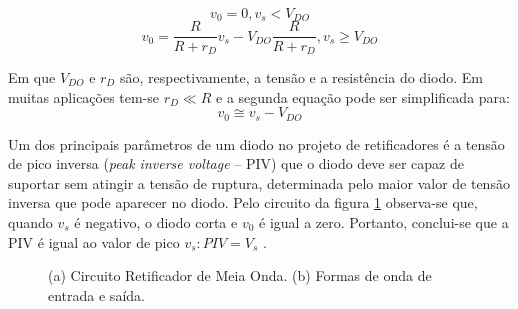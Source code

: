 \documentclass[a4paper]{article} %
\begin{document}
\begin{equation}
  v_0=0,       v_s<V_{DO}
\end{equation}
\begin{equation}
v_0=\frac{R}{R+r_D}v_s -V_{DO}\frac{R}{R+r_D},      v_s \geq V_{DO}
\end{equation}


    Em que   $V_{DO}$     e $r_D$ são, respectivamente, a tensão e a resistência do diodo.
         Em muitas aplicações tem-se  $r_D \ll R$           e a segunda equação pode ser simplificada para:
\begin{equation}
v_0 \cong v_s-V_{DO}
\end{equation}


         Um dos principais parâmetros de um diodo no projeto de retificadores é a tensão de pico inversa (\textit{peak inverse voltage} – PIV) que o diodo deve ser capaz de suportar sem atingir a
tensão de ruptura, determinada pelo maior valor de tensão inversa que pode aparecer no diodo. Pelo circuito da figura  \ref{fig:ret-circ1} observa-se que, quando $v_s$ é negativo, o diodo corta e   $v_0$      é
igual a zero. Portanto, conclui-se que a PIV é igual ao valor de pico $v_s:PIV=V_s$ .

\begin{figure}[h!]
\begin{centering}
\subfloat[]{

 \label{fig:ret-circ1(a)}
}

\par\end{centering}
\caption{(a) Circuito Retificador de Meia Onda. (b)  Formas de onda de entrada e saída. \label{fig:ret-circ1}}
\end{figure}
\end{document}
